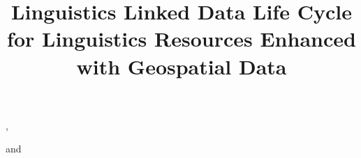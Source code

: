 \documentclass{iosart2c}
\begin{document}
\begin{frontmatter}                           %

\title{Linguistics Linked Data Life Cycle for Linguistics Resources Enhanced with Geospatial Data %
}



\author[A,B]{ },
\author[C]{ }
and
\author[D]{ }

\address[A]{Department of Intelligent Computer Systems, University of Malta, Msida, MSD2080, Malta}
\address[B]{Computational Linguistics Department, Saarland University, Saarbr\"ucken, 66121, Germany\\  E-mail: littauer@coli.uni-saarland.de}
\address[C]{Intelligent Software Components, iSOCO, S.A., Av. del Partenon 16-18, Madrid, Spain\\
E-mail: bvillazon@isoco.com}
\address[D]{Research Unit Quantitative Language Comparison, Ludwig Maximilian University, Geschwister Scholl Platz 1, D-80539 Munich, Germany\\ 
E-mail: bambooforest@gmail.com} %



\end{frontmatter}
\end{document}
